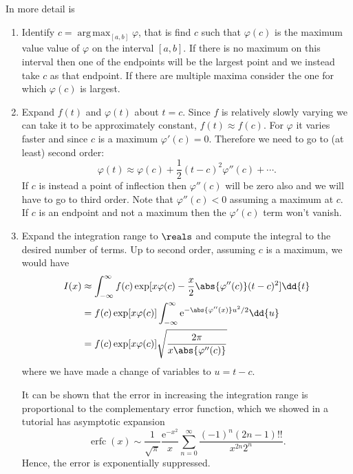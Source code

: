 \documentclass[fleqn]{NotesClass}
\newcommand*{\e}{\mathrm{e}}
\DeclareMathOperator*{\argmax}{arg\,max}
\DeclareMathOperator{\erfc}{erfc}
\begin{document}
    In more detail  is
    \begin{enumerate}
        \item Identify \(c = \argmax_{[a, b]}\varphi\), that is find \(c\) such that \(\varphi(c)\) is the maximum value value of \(\varphi\) on the interval \([a, b]\).
        If there is no maximum on this interval then one of the endpoints will be the largest point and we instead take \(c\) as that endpoint.
        If there are multiple maxima consider the one for which \(\varphi(c)\) is largest.
        
        \item Expand \(f(t)\) and \(\varphi(t)\) about \(t = c\).
        Since \(f\) is relatively slowly varying we can take it to be approximately constant, \(f(t) \approx f(c)\).
        For \(\varphi\) it varies faster and since \(c\) is a maximum \(\varphi'(c) = 0\).
        Therefore we need to go to (at least) second order:
        \begin{equation}
            \varphi(t) \approx \varphi(c) + \frac{1}{2}(t - c)^2\varphi''(c) + \dotsb.
        \end{equation}
        If \(c\) is instead a point of inflection then \(\varphi''(c)\) will be zero also and we will have to go to third order.
        Note that \(\varphi''(c) < 0\) assuming a maximum at \(c\).
        If \(c\) is an endpoint and not a maximum then the \(\varphi'(c)\) term won't vanish.
        
        
        \item Expand the integration range to \(\reals\) and compute the integral to the desired number of terms.
        Up to second order, assuming \(c\) is a maximum, we would have
        \begin{align}
            I(x) &\approx \int_{-\infty}^{\infty} f(c) \exp[x\varphi(c) - \frac{x}{2}\abs{\varphi''(c)}(t- c)^2] \dd{t}\\
            &= f(c)\exp[x\varphi(c)] \int_{-\infty}^{\infty} \e^{-\abs{\varphi''(x)}u^2/2}\dd{u}\\
            &= f(c)\exp[x\varphi(c)] \sqrt{\frac{2\pi}{x\abs{\varphi''(c)}}}\label{eqn:laplace method result}
        \end{align}
        where we have made a change of variables to \(u = t - c\).
        
        It can be shown that the error in increasing the integration range is proportional to the complementary error function, which we showed in a tutorial has asymptotic expansion
        \begin{equation}
            \erfc(x) \sim \frac{1}{\sqrt{\pi}} \frac{\e^{-x^2}}{x} \sum_{n=0}^{\infty} \frac{(-1)^n(2n - 1)!!}{x^{2n}2^n}.
        \end{equation}
        Hence, the error is exponentially suppressed.
    \end{enumerate}
    
\end{document}
